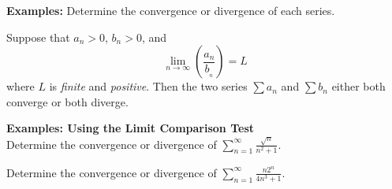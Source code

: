 \noindent\textbf{Examples:} Determine the convergence or divergence of each series.

\newpage

\begin{tcolorbox}[title= THE LIMIT COMPARISON TEST,colframe=black,sharp corners,colback=white,colbacktitle=white,coltitle=black]

    Suppose that $a_n>0,\,b_n>0$, and
    \[\lim_{n\to\infty}\left(\frac{a_n}{b__n}\right)=L\]
    where $L$ is \textit{finite} and \textit{positive}. Then the two series $\displaystyle\sum a_n$ and $\displaystyle\sum b_n$ either both converge or both diverge.

\end{tcolorbox}
\vspace{.1in}
\noindent\textbf{Examples: Using the Limit Comparison Test}\\
Determine the convergence or divergence of $\displaystyle\sum_{n=1}^{\infty}\frac{\sqrt{n}}{n^2+1}$.


Determine the convergence or divergence of $\displaystyle\sum_{n=1}^\infty\frac{n2^n}{4n^3+1}$.




\newpage
